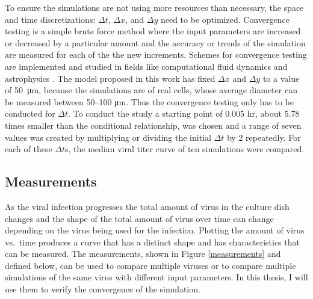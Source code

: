 To ensure the simulations are not using more resources than necessary, the space and time discretizations: $\Delta t$, $\Delta x$, and $\Delta y$ need to be optimized. Convergence testing is a simple brute force method where the input parameters are increased or decreased by a particular amount and the accuracy or trends of the simulation are measured for each of the the new increments. Schemes for convergence testing are implemented and studied in fields like computational fluid dynamics \citep{bermejo16,kim20fluid} and astrophysics \citep{xu21,banei21}. The model proposed in this work has fixed $\Delta x$ and $\Delta y$ to a value of \SI{50}{\micro\meter}, because the simulations are of real cells, whose average diameter can be measured between \numrange[range-phrase = --]{50}{100} \si{\micro\meter}. Thus the convergence testing only has to be conducted for $\Delta t$. To conduct the study a starting point of 0.005 hr, about 5.78 times smaller than the conditional relationship, was chosen and a range of seven values was created by multiplying or dividing the initial $\Delta t$ by 2 repeatedly. For each of these $\Delta t$s, the median viral titer curve of ten simulations were compared.

\subsection{Measurements} \label{convergence_measures}

As the viral infection progresses the total amount of virus in the culture dish changes and the shape of the total amount of virus over time can change depending on the virus being used for the infection. Plotting the amount of virus vs.\ time produces a curve that has a distinct shape and has characteristics that can be measured. The measurements, shown in Figure \ref{measurements} and defined below, can be used to compare multiple viruses or to compare multiple simulations of the same virus with different input parameters. In this thesis, I will use them to verify the convergence of the simulation.

